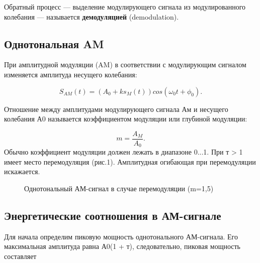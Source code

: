\documentclass[a4paper,14pt]{article}
\begin{document}
\hspace{0,5cm}Обратный процесс — выделение модулирующего сигнала из модулированного колебания — называется \textbf{демодуляцией} (demodulation).

\subsection{Однотональная AM}
\hspace{0,5cm}При амплитудной модуляции (AM) в соответствии с модулирующим сигналом изменяется амплитуда несущего колебания:

\[
	S_{AM}(t) = (A_0 + ks_M(t)) cos(\omega_0t+\phi_0).
\]

\hspace{0,5cm}Отношение между амплитудами модулирующего сигнала Ам и несущего колебания А0 называется коэффициентом модуляции или глубиной модуляции:

\[
	m=\frac{A_M}{A_0}.
\]
\hspace{0,5cm}Обычно коэффициент модуляции должен лежать в диапазоне 0...1. При т > 1
имеет место перемодуляция (рис.1). Амплитудная огибающая при перемодуляции искажается.
\begin{figure}[bh]
	\noindent{}
	\caption{Однотональный АМ-сигнал в случае перемодуляции (m=1,5)}
	\label{figCurves}
\end{figure}

\subsection{Энергетические соотношения в АМ-сигнале}

\hspace{0,5cm}Для начала определим пиковую мощность однотонального АМ-сигнала. Его максимальная амплитуда равна А0(1 + т), следовательно, пиковая мощность составляет
\end{document}
